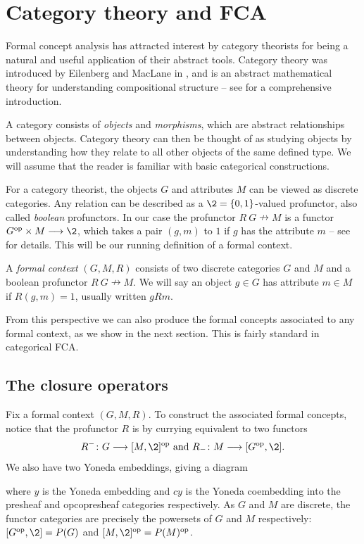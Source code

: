 

\section{Category theory and FCA}

Formal concept analysis has attracted interest by category theorists for being a natural and useful application of their abstract tools. Category theory was introduced by Eilenberg and MacLane in \cite{eilenberg-maclane_1945}, and is an abstract mathematical theory for understanding compositional structure -- see \cite{maclane_1998} for a comprehensive introduction. 

A category consists of \emph{objects} and \emph{morphisms}, which are abstract relationships between objects. Category theory can then be thought of as studying objects by understanding how they relate to all other objects of the same defined type. We will assume that the reader is familiar with basic categorical constructions. 

For a category theorist, the objects $G$ and attributes $M$ can be viewed as discrete categories. Any relation can be described as a $\2 = \{0,1\}$-valued profunctor, also called \emph{boolean} profunctors. In our case the profunctor $R\: G\nrightarrow M$ is a functor $G\op\times M\to \2$, which takes a pair $(g,m)$ to $1$ if $g$ has the attribute $m$ -- see \cite{ferrer_2023} for details. This will be our running definition of a formal context. 

\begin{definition}
    A \emph{formal context} $(G,M,R)$ consists of two discrete categories $G$ and $M$ and a boolean profunctor $R\: G\nrightarrow M$. We will say an object $g\in G$ has attribute $m\in M$ if $R(g,m)=1$, usually written $gRm$. 
\end{definition}

From this perspective we can also produce the formal concepts associated to any formal context, as we show in the next section. This is fairly standard in categorical FCA. 

\subsection{The closure operators}

Fix a formal context $(G,M,R)$. To construct the associated formal concepts, notice that the profunctor $R$ is by currying equivalent to two functors 
\[R^{-}\: G \to [M, \2]\op \text{ and } R_{-}\: M \to [G\op, \2].\]
We also have two Yoneda embeddings, giving a diagram
\begin{center}
\end{center}
where $y$ is the Yoneda embedding and $cy$ is the Yoneda coembedding into the presheaf and opcopresheaf categories respectively. As $G$ and $M$ are discrete, the functor categories are precisely the powersets of $G$ and $M$ respectively: $[G\op, \2] = P(G)$ and $[M, \2]\op = P(M)\op$. 

